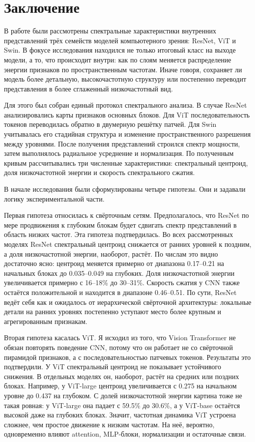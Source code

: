 \chapter{Заключение}

В работе были рассмотрены спектральные характеристики внутренних представлений трёх семейств моделей компьютерного зрения: ResNet, ViT и Swin. В фокусе исследования находился не только итоговый класс на выходе модели, а то, что происходит внутри: как по слоям меняется распределение энергии признаков по пространственным частотам. Иначе говоря, сохраняет ли модель более детальную, высокочастотную структуру или постепенно переводит представления в более сглаженный низкочастотный вид.

Для этого был собран единый протокол спектрального анализа. В случае ResNet анализировались карты признаков основных блоков. Для ViT последовательность токенов переводилась обратно в двумерную решётку патчей. Для Swin учитывалась его стадийная структура и изменение пространственного разрешения между уровнями. После получения представлений строился спектр мощности, затем выполнялось радиальное усреднение и нормализация. По полученным кривым рассчитывались три численные характеристики: спектральный центроид, доля низкочастотной энергии и скорость спектрального сжатия.

В начале исследования были сформулированы четыре гипотезы. Они и задавали логику экспериментальной части.

Первая гипотеза относилась к свёрточным сетям. Предполагалось, что ResNet по мере продвижения к глубоким блокам будет сдвигать спектр представлений в область низких частот. Эта гипотеза подтвердилась. Во всех рассмотренных моделях ResNet спектральный центроид снижается от ранних уровней к поздним, а доля низкочастотной энергии, наоборот, растёт. По числам это видно достаточно ясно: центроид меняется примерно от диапазона 0.17--0.21 на начальных блоках до 0.035--0.049 на глубоких. Доля низкочастотной энергии увеличивается примерно с 16--18\% до 30--31\%. Скорость сжатия у CNN также остаётся положительной и находится в диапазоне 0.46--0.51. По сути, ResNet ведёт себя как и ожидалось от иерархической свёрточной архитектуры: локальные детали на ранних уровнях постепенно уступают место более крупным и агрегированным признакам.

Вторая гипотеза касалась ViT. Я исходил из того, что Vision Transformer не обязан повторять поведение CNN, потому что он работает не со свёрточной пирамидой признаков, а с последовательностью патчевых токенов. Результаты это подтвердили. У ViT спектральный центроид не показывает устойчивого снижения. В отдельных моделях он, наоборот, растёт на средних или поздних блоках. Например, у ViT-large центроид увеличивается с 0.275 на начальном уровне до 0.437 на глубоком. С долей низкочастотной энергии картина тоже не такая ровная: у ViT-large она падает с 59.5\% до 30.6\%, а у ViT-base остаётся высокой даже на глубоких блоках. Значит, частотная динамика ViT устроена сложнее, чем простое движение к низким частотам. На неё, вероятно, одновременно влияют attention, MLP-блоки, нормализации и остаточные связи.


